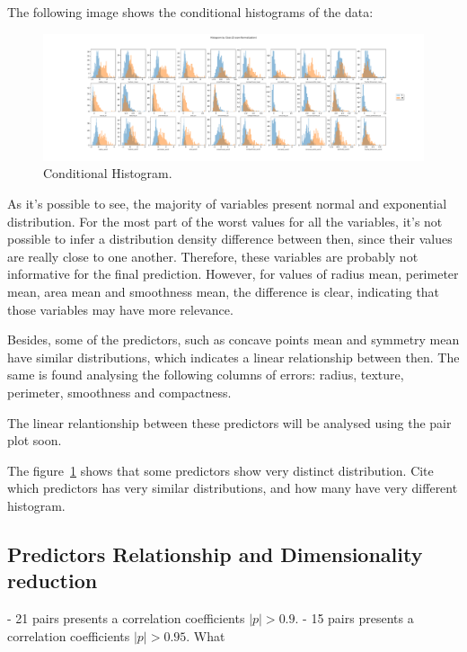 \documentclass[conference]{IEEEtran}
\newcommand{\reviewUrgent}[1]{{\color{red} #1}} %
\begin{document}
The following image shows the conditional histograms of the data:

\begin{figure}[htpb!]
    \centerline{\includegraphics[width=1.2 \textwidth]{../../code/hw1/figures/3-1-conditional-histogram.pdf}}
    \caption{Conditional Histogram.}
    \label{fig:3-1-conditional-histogram}
\end{figure}

As it's possible to see, the majority of variables present normal and exponential 
distribution. For the most part of the worst values for all the variables, it's not 
possible to infer a distribution density difference between then, since their values 
are really close to one another. Therefore, these variables are probably not 
informative for the final prediction. However, for values of radius mean, perimeter 
mean, area mean and smoothness mean, the difference is clear, indicating that 
those variables may have more relevance. 

Besides, some of the predictors, such as concave points mean and symmetry mean have 
similar distributions, which indicates a linear relationship between then. The same 
is found analysing the following columns of errors: radius, texture, perimeter, 
smoothness and compactness.

The linear relantionship between these predictors will be analysed using the pair 
plot soon.



The figure~\ref{fig:3-1-conditional-histogram} shows that some predictors show very distinct distribution. \reviewUrgent{Cite which predictors has very similar distributions, and how many have very different histogram.}

\clearpage


\subsection{Predictors Relationship and Dimensionality reduction}

- 21 pairs presents a correlation coefficients $|p| > 0.9$. 
- 15 pairs presents a correlation coefficients $|p| > 0.95$.
What
\end{document}
